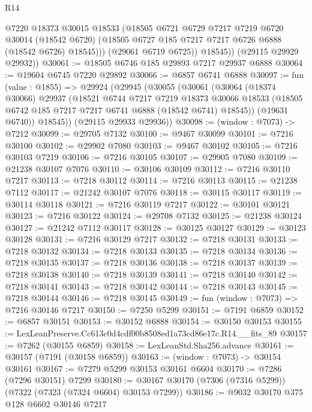 \begin{lexlean}{R14}
\begin{coremodule}
              @7220
              @18373
              @30015
              @18533
              (@18505
                @6721
                @6729
                @7217
                @7219
                @6720
                @30014
                (@18542 @6720)
                (@18505 @6727 @185 @7217 @7217 @6726 @6888 (@18542 @6726) @18545)))
            (@29061 @6719 @6725))
          @18545))
      (@29115 @29929 @29932))
@30061 := @18505 @6746 @185 @29893 @7217 @29937 @6888
@30064 := @19604 @6745 @7220 @29892
@30066 := @6857 @6741 @6888
@30097 := fun (value : @1855) =>
  @29924
    (@29945
      (@30055
        (@30061
          (@30064
            (@18374 @30066)
            @29937
            (@18521
              @6744
              @7217
              @7219
              @18373
              @30066
              @18533
              (@18505 @6742 @185 @7217 @7217 @6741 @6888 (@18542 @6741) @18545))
            (@19631 @6740))
          @18545))
      (@29115 @29933 @29936))
@30098 := (window : @7073) -> @7212
@30099 := @29705 @7132
@30100 := @9467 @30099
@30101 := @7216 @30100
@30102 := @29902 @7080
@30103 := @9467 @30102
@30105 := @7216 @30103 @7219
@30106 := @7216 @30105
@30107 := @29905 @7080
@30109 := @21238 @30107 @7076
@30110 := @30106 @30109
@30112 := @7216 @30110 @7217
@30113 := @7218 @30112
@30114 := @7216 @30113
@30115 := @21238 @7112
@30117 := @21242 @30107 @7076
@30118 := @30115 @30117
@30119 := @30114 @30118
@30121 := @7216 @30119 @7217
@30122 := @30101 @30121
@30123 := @7216 @30122
@30124 := @29708 @7132
@30125 := @21238 @30124
@30127 := @21242 @7112 @30117
@30128 := @30125 @30127
@30129 := @30123 @30128
@30131 := @7216 @30129 @7217
@30132 := @7218 @30131
@30133 := @7218 @30132
@30134 := @7218 @30133
@30135 := @7218 @30134
@30136 := @7218 @30135
@30137 := @7218 @30136
@30138 := @7218 @30137
@30139 := @7218 @30138
@30140 := @7218 @30139
@30141 := @7218 @30140
@30142 := @7218 @30141
@30143 := @7218 @30142
@30144 := @7218 @30143
@30145 := @7218 @30144
@30146 := @7218 @30145
@30149 := fun (window : @7073) => @7216 @30146 @7217
@30150 := @7250 @5299
@30151 := @7191 @6859
@30152 := @6857 @30151
@30153 := @30152 @6888
@30154 := @30150 @30153
@30155 := LexLeanPreserve.Cc613c0d4cdf00b8508ed1a73cd86e17c.R14.__fits_89
@30157 := @7262 (@30155 @6859)
@30158 := LexLeanStd.Sha256.advance
@30161 := @30157 (@7191 (@30158 @6859))
@30163 := (window : @7073) -> @30154 @30161
@30167 := @7279 @5299 @30153 @30161 @6604
@30170 := @7286 (@7296 @30151) @7299
@30180 := @30167 @30170 (@7306 (@7316 @5299)) (@7322 (@7323 (@7324 @6604) @30153 @7299))
@30186 := @9032 @30170 @375 @128 @6602 @30146 @7217

\end{coremodule}
\end{lexlean}
